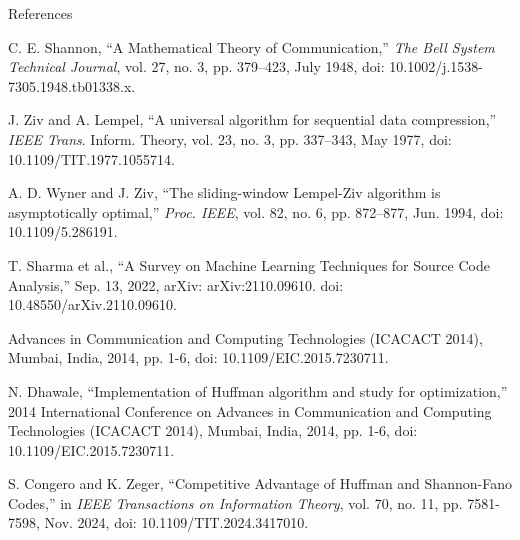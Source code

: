 \documentclass[mathserif, 13pt, aspectratio=1610]{beamer}
\begin{document}
\begin{frame}{References}
	\tiny
	\begin{thebibliography}{99}
		 C. E. Shannon, ``A Mathematical Theory of Communication,'' \textit{The Bell System Technical Journal}, vol. 27, no. 3, pp. 379–423, July 1948, doi: 10.1002/j.1538-7305.1948.tb01338.x.

		 J. Ziv and A. Lempel, “A universal algorithm for sequential data compression,” \textit{IEEE Trans}. Inform. Theory, vol. 23, no. 3, pp. 337–343, May 1977, doi: 10.1109/TIT.1977.1055714.
	
		 A. D. Wyner and J. Ziv, “The sliding-window Lempel-Ziv algorithm is asymptotically optimal,” \textit{Proc. IEEE}, vol. 82, no. 6, pp. 872–877, Jun. 1994, doi: 10.1109/5.286191.
	
		 T. Sharma et al., ``A Survey on Machine Learning Techniques for Source Code Analysis,'' Sep. 13, 2022, arXiv: arXiv:2110.09610. doi: 10.48550/arXiv.2110.09610.
	
		 Advances in Communication and Computing Technologies (ICACACT 2014), Mumbai, India, 2014, pp. 1-6, doi: 10.1109/EIC.2015.7230711.
	
		 N. Dhawale, ``Implementation of Huffman algorithm and study for optimization,'' 2014 International Conference on Advances in Communication and Computing Technologies (ICACACT 2014), Mumbai, India, 2014, pp. 1-6, doi: 10.1109/EIC.2015.7230711.
	
		 S. Congero and K. Zeger, ``Competitive Advantage of Huffman and Shannon-Fano Codes,'' in \textit{IEEE Transactions on Information Theory}, vol. 70, no. 11, pp. 7581-7598, Nov. 2024, doi: 10.1109/TIT.2024.3417010.
	\end{thebibliography}
\end{frame}
\end{document}
